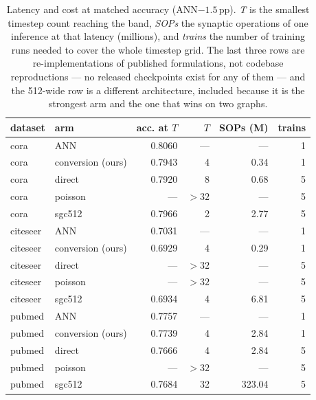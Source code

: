 \begin{table}[t]
\centering
\footnotesize
\caption{Latency and cost at matched accuracy (ANN$-1.5$\,pp). \emph{T} is the smallest timestep
count reaching the band, \emph{SOPs} the synaptic operations of one inference at that latency
(millions), and \emph{trains} the number of training runs needed to cover the whole timestep grid.
The last three rows are re-implementations of published formulations, not codebase reproductions
--- no released checkpoints exist for any of them --- and the 512-wide row is a different
architecture, included because it is the strongest arm and the one that wins on two graphs.}
\label{tab:pareto}
\begin{tabular}{llrrrr}
\toprule
dataset & arm & acc. at $T$ & $T$ & SOPs (M) & trains \\
\midrule
cora & ANN & 0.8060 & --- & --- & 1 \\
cora & conversion (ours) & 0.7943 & 4 & 0.34 & 1 \\
cora & direct & 0.7920 & 8 & 0.68 & 5 \\
cora & poisson & --- & $>32$ & --- & 5 \\
cora & sgc512 & 0.7966 & 2 & 2.77 & 5 \\
citeseer & ANN & 0.7031 & --- & --- & 1 \\
citeseer & conversion (ours) & 0.6929 & 4 & 0.29 & 1 \\
citeseer & direct & --- & $>32$ & --- & 5 \\
citeseer & poisson & --- & $>32$ & --- & 5 \\
citeseer & sgc512 & 0.6934 & 4 & 6.81 & 5 \\
pubmed & ANN & 0.7757 & --- & --- & 1 \\
pubmed & conversion (ours) & 0.7739 & 4 & 2.84 & 1 \\
pubmed & direct & 0.7666 & 4 & 2.84 & 5 \\
pubmed & poisson & --- & $>32$ & --- & 5 \\
pubmed & sgc512 & 0.7684 & 32 & 323.04 & 5 \\
\bottomrule
\end{tabular}
\end{table}
